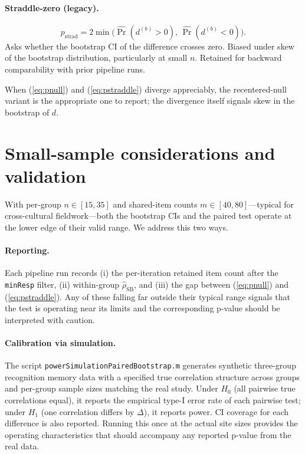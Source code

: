 \documentclass[11pt]{article}
\begin{document}
\paragraph{Straddle-zero (legacy).}
\begin{equation}
p_{\mathrm{strad}} = 2\min\!\bigl(\widehat{\Pr}(d^{(b)}>0),\,\widehat{\Pr}(d^{(b)}<0)\bigr).
\label{eq:pstraddle}
\end{equation}
Asks whether the bootstrap CI of the difference crosses zero. Biased under skew of the bootstrap distribution, particularly at small $n$. Retained for backward comparability with prior pipeline runs.

When (\ref{eq:pnull}) and (\ref{eq:pstraddle}) diverge appreciably, the recentered-null variant is the appropriate one to report; the divergence itself signals skew in the bootstrap of $d$.

\section{Small-sample considerations and validation}
With per-group $n\in[15,35]$ and shared-item counts $m\in[40,80]$---typical for cross-cultural fieldwork---both the bootstrap CIs and the paired test operate at the lower edge of their valid range. We address this two ways.

\paragraph{Reporting.} Each pipeline run records (i) the per-iteration retained item count after the \texttt{minResp} filter, (ii) within-group $\hat\rho_{\mathrm{SB}}$, and (iii) the gap between (\ref{eq:pnull}) and (\ref{eq:pstraddle}). Any of these falling far outside their typical range signals that the test is operating near its limits and the corresponding p-value should be interpreted with caution.

\paragraph{Calibration via simulation.} The script \texttt{powerSimulationPairedBootstrap.m} generates synthetic three-group recognition memory data with a specified true correlation structure across groups and per-group sample sizes matching the real study. Under $H_0$ (all pairwise true correlations equal), it reports the empirical type-I error rate of each pairwise test; under $H_1$ (one correlation differs by $\Delta$), it reports power. CI coverage for each difference is also reported. Running this once at the actual site sizes provides the operating characteristics that should accompany any reported p-value from the real data.
\end{document}
